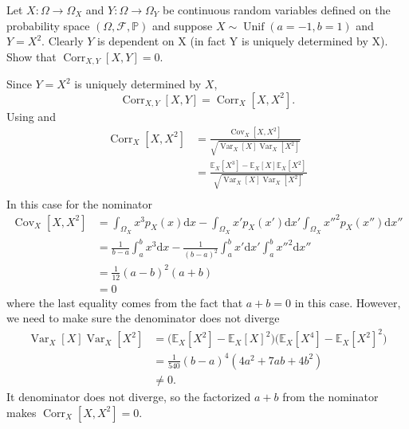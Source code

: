 \begin{example}
	Let $X\colon\Omega \to \Omega_X$ and $Y\colon\Omega\to \Omega_Y$ be continuous random variables defined on the probability space $(\Omega,\mathcal{F},\mathbb{P})$ and suppose $X\sim \operatorname{Unif}(a=-1, b=1)$ and $Y=X^2$. Clearly $Y$ is dependent on X (in fact Y is uniquely determined by X). Show that $\operatorname{Corr}_{X,Y}[X,Y]=0$.\newline
	
	Since $Y=X^2$ is uniquely determined by $X$,
	\begin{equation}
		\operatorname{Corr}_{X,Y}[X,Y] = \operatorname{Corr}_{X}[X,X^2].
	\end{equation}
	Using  and 
	\begin{equation}
		\begin{split}
			\operatorname{Corr}_{X}[X,X^2] & = \frac{\operatorname{Cov}_{X}[X,X^2]}{\sqrt{\operatorname{Var}_X[X]\operatorname{Var}_X[X^2]}}\\
			& = \frac{\mathbb{E}_{X}[X^3]-\mathbb{E}_X[X]\mathbb{E}_X[X^2]}{\sqrt{\operatorname{Var}_X[X]\operatorname{Var}_X[X^2]}}\\
		\end{split}
	\end{equation}
	In this case for the nominator
	\begin{equation}
		\begin{split}
			\operatorname{Cov}_{X}[X,X^2] &= \int_{\Omega_X} x^3 p_X(x) \mathrm{d}x-\int_{\Omega_X} x'p_X(x') \mathrm{d}x'\int_{\Omega_X} x''^2p_X(x'') \mathrm{d}x''\\
			&= \frac{1}{b-a}\int_{a}^{b}x^3\mathrm{d}x-\frac{1}{(b-a)^2}\int_{a}^{b} x' \mathrm{d}x'\int_{a}^{b} x''^2 \mathrm{d}x''\\
			&= \frac{1}{12}(a-b)^2(a+b)\\
			&=0
		\end{split}
	\end{equation}
	where the last equality comes from the fact that $a+b = 0$ in this case. However, we need to make sure the denominator does not diverge
	\begin{equation}
		\begin{split}
			\operatorname{Var}_X[X]\operatorname{Var}_X[X^2] & =\big(\mathbb{E}_X[X^2]-\mathbb{E}_X[X]^2\big) \big(\mathbb{E}_X[X^4]-\mathbb{E}_X[X^2]^2\big)\\
			& = \frac{1}{540}(b-a)^4(4a^2+7ab+4b^2)\\
			&\neq 0.
		\end{split}
	\end{equation}
	It denominator does not diverge, so the factorized $a+b$ from the nominator makes $\operatorname{Corr}_{X}[X,X^2]=0$.
\end{example}

